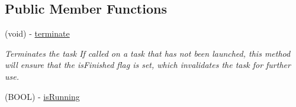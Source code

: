 \subsection*{Public Member Functions}
\begin{CompactItemize}
\item 
\hypertarget{interface_m_f_task_0f00a34ccef9cecb2d1baade7d2d8b84}{
(void) - \hyperlink{interface_m_f_task_0f00a34ccef9cecb2d1baade7d2d8b84}{terminate}}
\label{interface_m_f_task_0f00a34ccef9cecb2d1baade7d2d8b84}

\begin{CompactList}\small\item\em Terminates the task If called on a task that has not been launched, this method will ensure that the isFinished flag is set, which invalidates the task for further use. \item\end{CompactList}\item 
\hypertarget{interface_m_f_task_b18f0d7bc953b4dd31e10f516f9f020d}{
(BOOL) - \hyperlink{interface_m_f_task_b18f0d7bc953b4dd31e10f516f9f020d}{isRunning}}
\label{interface_m_f_task_b18f0d7bc953b4dd31e10f516f9f020d}


\end{CompactItemize}
